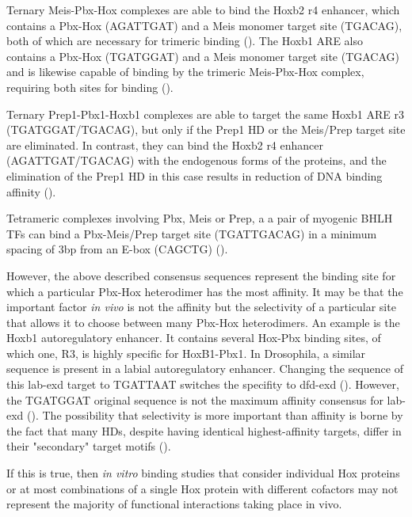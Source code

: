 Ternary Meis-Pbx-Hox complexes are able to bind the Hoxb2 r4 enhancer, which contains a Pbx-Hox (AGATTGAT) and a Meis monomer target site (TGACAG), both of which are necessary for trimeric binding (\cite{Jacobs1999}). The Hoxb1 \ac{ARE} also contains a Pbx-Hox (TGATGGAT) and a Meis monomer target site (TGACAG) and is likewise capable of binding by the trimeric Meis-Pbx-Hox complex, requiring both sites for binding (\cite{Jacobs1999}).

Ternary Prep1-Pbx1-Hoxb1 complexes are able to target the same Hoxb1 \ac{ARE} r3 (TGATGGAT/TGACAG), but only if the Prep1 \ac{HD} or the Meis/Prep target site are eliminated. In contrast, they can bind the Hoxb2 r4 enhancer (AGATTGAT/TGACAG) with the endogenous forms of the proteins, and the elimination of the Prep1 \ac{HD} in this case results in reduction of DNA binding affinity (\cite{Ferretti2000}).

Tetrameric complexes involving Pbx, Meis or Prep, a a pair of myogenic \ac{BHLH} \acp{TF} can bind a Pbx-Meis/Prep target site (TGATTGACAG) in a minimum spacing of 3bp from an E-box (CAGCTG) (\cite{Knoepfler1999}).

However, the above described consensus sequences represent the binding site for which a particular Pbx-Hox heterodimer has the most affinity. It may be that the important factor \textit{in vivo} is not the affinity but the selectivity of a particular site that allows it to choose between many Pbx-Hox heterodimers. An example is the Hoxb1 autoregulatory enhancer. It contains several Hox-Pbx binding sites, of which one, R3, is highly specific for HoxB1-Pbx1. In Drosophila, a similar sequence is present in a labial autoregulatory enhancer. Changing the sequence of this lab-\ac{exd} target to TGATTAAT switches the specifity to dfd-\ac{exd} (\cite{Chan1997}). However, the TGATGGAT original sequence is not the maximum affinity consensus for lab-\ac{exd} (\cite{Mann1998,Shen1997}). The possibility that selectivity is more important than affinity is borne by the fact that many \acp{HD}, despite having identical highest-affinity targets, differ in their "secondary" target motifs (\cite{Berger2008}).

If this is true, then \textit{in vitro} binding studies that consider individual Hox proteins or at most combinations of a single Hox protein with different cofactors may not represent the majority of functional interactions taking place in vivo. 

		
